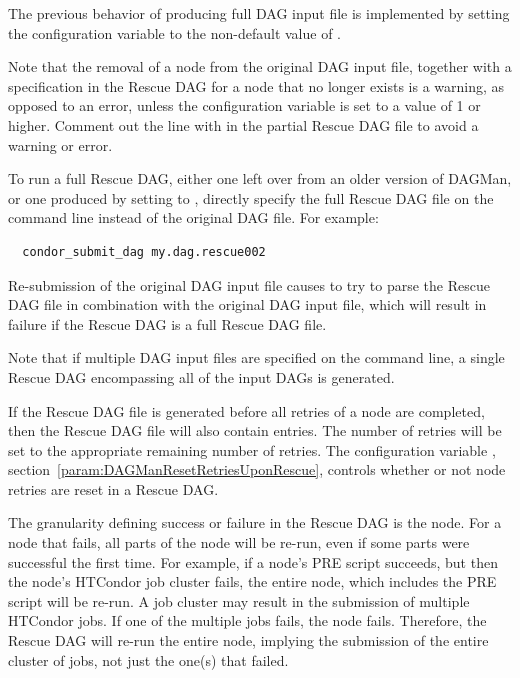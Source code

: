 The previous behavior of producing full DAG input file 
is implemented by setting the configuration variable
 to the non-default 
value of .  

Note that the removal of a node from the original DAG input file, 
together with a  specification in the Rescue DAG 
for a node that no longer exists is a warning,
as opposed to an error, 
unless the  configuration
variable is set to a value of 1 or higher.  
Comment out the line with  in the partial Rescue DAG file
to avoid a warning or error.

To run a full Rescue DAG,
either one left over from an older version of DAGMan, 
or one produced by setting  
to , 
directly specify the full Rescue DAG file on the command line
instead of the original DAG file.
For example:

\begin{verbatim}
  condor_submit_dag my.dag.rescue002
\end{verbatim}

Re-submission of the original DAG input file causes  to try to
parse the Rescue DAG file in combination with the original DAG input file, 
which will result in failure if the Rescue DAG is a full Rescue DAG file.

Note that if multiple DAG input files are specified on the
 command line,
a single Rescue DAG encompassing all of the input DAGs is generated.

If the Rescue DAG file is generated before all retries
of a node are completed, 
then the Rescue DAG file will also contain  entries.
The number of retries will be set to the appropriate remaining
number of retries.
The configuration variable , 
section~\ref{param:DAGManResetRetriesUponRescue},
controls whether or not node retries are reset in a Rescue DAG.

The granularity defining success or failure
in the Rescue DAG is the node.
For a node that fails,
all parts of the node will be re-run,
even if some parts were successful the first time.
For example, if a node's PRE script
succeeds, but then the node's HTCondor job cluster fails,
the entire node, which includes the PRE script will be re-run.
A job cluster may result in the submission of multiple HTCondor jobs.
If one of the multiple jobs fails, the node fails.
Therefore, the Rescue DAG will
re-run the entire node,
implying the submission of the entire cluster of jobs,
not just the one(s) that failed.

